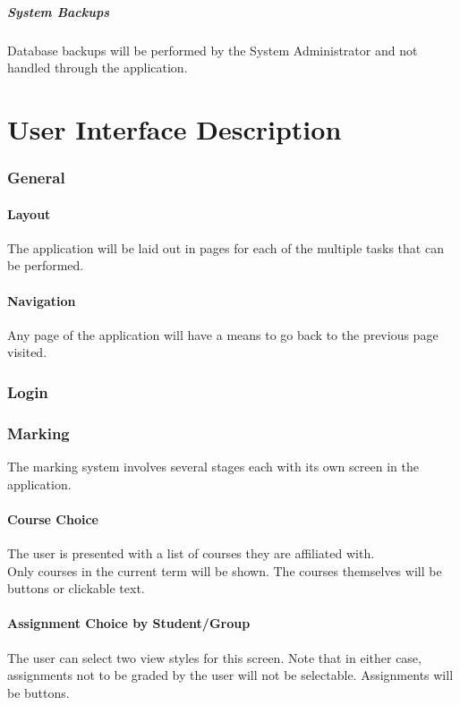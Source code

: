 \documentclass{article}
\begin{document}
\subsubsection{System Backups}
Database backups will be performed by the System Administrator and not handled
through the application.

\part{User Interface Description}

\section{General}
\subsection{Layout}
The application will be laid out in pages for each of the multiple tasks that
can be performed.
\subsection{Navigation}
Any page of the application will have a means to go back to the previous
page visited.

\section{Login}

\section{Marking}
The marking system involves several stages each with its own screen in
the application.
\subsection{Course Choice}
The user is presented with a list of courses they are affiliated with. \\
Only courses in the current term will be shown. The courses themselves
will be buttons or clickable text.
\subsection{Assignment Choice by Student/Group}
The user can select two view styles for this screen. Note that in either case,
assignments not to be graded by the user will not be selectable. Assignments
will be buttons.
\end{document}
